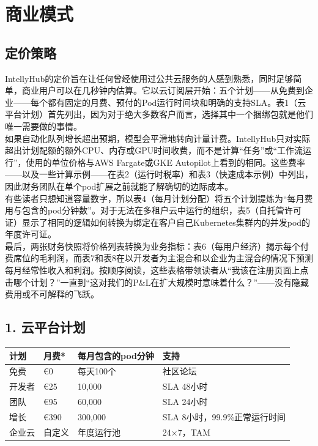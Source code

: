 \documentclass[11pt, a4paper, oneside]{article}
\begin{document}
\section{商业模式}
\subsection{定价策略}
IntellyHub的定价旨在让任何曾经使用过公共云服务的人感到熟悉，同时足够简单，商业用户可以在几秒钟内估算。它以云订阅层开始：五个计划——从免费到企业——每个都有固定的月费、预付的Pod运行时间块和明确的支持SLA。表1（云平台计划）首先列出，因为对于绝大多数客户而言，选择其中一个捆绑包就是他们唯一需要做的事情。\\

如果自动化队列增长超出预期，模型会平滑地转向计量计费。IntellyHub只对实际超出计划配额的额外CPU、内存或GPU时间收费，而不是计算“任务”或“工作流运行”，使用的单位价格与AWS Fargate或GKE Autopilot上看到的相同。这些费率——以及一些计算示例——在表2（运行时税率）和表3（快速成本示例）中列出，因此财务团队在单个pod扩展之前就能了解确切的边际成本。\\

有些读者只想知道容量数字，所以表4（每月计划分配）将五个计划提炼为“每月费用与包含的pod分钟数”。对于无法在多租户云中运行的组织，表5（自托管许可证）显示了相同的逻辑如何转换为绑定在客户自己Kubernetes集群内的并发pod的年度许可证。\\

最后，两张财务快照将价格列表转换为业务指标：表6（每用户经济）揭示每个付费席位的毛利润，而表7和表8在以开发者为主混合和以企业为主混合的情况下预测每月经常性收入和利润。按顺序阅读，这些表格带领读者从“我该在注册页面上点击哪个计划？”一直到“这对我们的P\&L在扩大规模时意味着什么？”——没有隐藏费用或不可解释的飞跃。

\subsection*{1. 云平台计划}
\begin{center}
\begin{tabular}{@{}llll@{}}
\toprule
\textbf{计划} & \textbf{月费*} & \textbf{每月包含的pod分钟} & \textbf{支持} \\
\midrule
免费 & €0 & 每天100个 & 社区论坛 \\
开发者 & €25 & 10,000 & SLA 48小时 \\
团队 & €95 & 60,000 & SLA 24小时 \\
增长 & €390 & 300,000 & SLA 8小时，99.9\%正常运行时间 \\
企业云 & 自定义 & 年度运行池 & 24×7，TAM \\
\bottomrule
\end{tabular}
\end{center}
\end{document}
